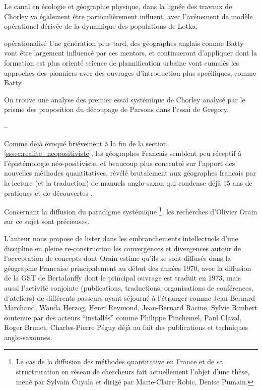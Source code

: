 Le canal en écologie et géographie physique, dans la lignée des travaux de Chorley va également être particulièrement influent, avec l'avénement de modèle opérationel dérivée de la dynamique des populations de Lotka. \autocite{Batty 1971 ou 1972 ....}

 opérationalisé  Une génération plus tard, des géographes anglais comme Batty vont être largement influencé par ces mentors, et continueront d'appliquer dont la formation est plus orienté science de plannification urbaine vont cumulés les approches des pionniers avec des ouvrages d'introduction plus spcéifiques, comme Batty

On trouve une analyse des premier essai systémique de Chorley analysé par le prisme des proposition du découpage de Parsons dans l'essai de Gregory. 



--

Comme déjà évoqué briévement à la fin de la section \ref{sssec:realite_neopositiviste}, les géographes Francais semblent peu réceptif à l'épistémologie néo-positiviste, et beaucoup plus concentré sur l'apport des nouvelles méthodes quantitatives, révélé brutalement aux géographes francais par la lecture (et la traduction) de manuels anglo-saxon qui condense déjà 15 ans de pratiques et de découvertes \autocite[129]{Pumain2002}. 

Concernant la diffusion du paradigme systémique \footnote{Le cas de la diffusion des méthodes quantitative en France et de sa structruration en réseau de chercheurs fait actuellement l'objet d'une thèse, mené par Sylvain Cuyala et dirigé par Marie-Claire Robic, Denise Pumain.
}, les recherches d'Olivier Orain \autocite{Orain2001} sur ce sujet sont précieuses.

L'auteur nous propose de lister dans les embranchements intellectuels d'une discipline en pleine re-construction les convergences et divergences autour de l'acceptation de concepts dont Orain estime qu'ils se sont diffusés dans la géographie Francaise principalement au début des années 1970, avec la diffusion de la GST de Bertalanffy dont le principal ouvrage est traduit en 1973, mais aussi l'activité conjointe (publications, traductions, organisations de conférences, d'ateliers) de différents passeurs ayant séjourné à l'étranger comme Jean-Bernard Marchand, Wanda Herzog, Henri Reymond, Jean-Bernard Racine, Sylvie Rimbert soutenue par des acteurs \enquote{installés} comme Philippe Pinchemel, Paul Claval, Roger Brunet, Charles-Pierre Péguy \autocite{Pumain2002,Cauvin2007} déjà au fait des publications et techniques anglo-saxonnes. 

